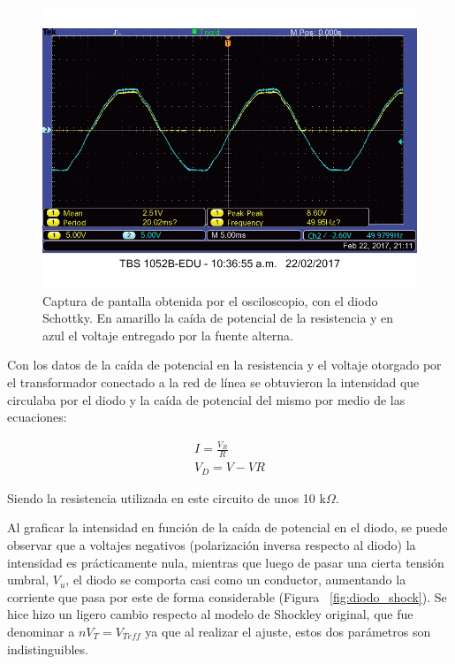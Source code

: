 \documentclass[twoside,twocolumn,a4paper]{article}
\begin{document}
\begin{figure}[h]
\includegraphics[width=\linewidth]{Diodo.jpg}
\captionsetup{justification=centering}
\caption{Captura de pantalla obtenida por el osciloscopio, con el diodo Schottky. En amarillo la ca\'ida de potencial de la resistencia y en azul el voltaje entregado por la fuente alterna.}
\label{fig:diodo2}
\end{figure}

Con los datos de la ca\'ida de potencial en la resistencia y el voltaje otorgado por el transformador conectado a la red de l\'inea se obtuvieron la intensidad que circulaba por el diodo y la ca\'ida de potencial del mismo por medio de las ecuaciones:

\begin{gather}
I=\frac{V_R}{R} \\
V_D=V-VR
\end{gather}

Siendo la resistencia utilizada en este circuito de unos 10 k$\Omega$.
\bigbreak

Al graficar la intensidad en funci\'on de la ca\'ida de potencial en el diodo, se puede observar que a voltajes negativos (polarizaci\'on inversa respecto al diodo) la intensidad es pr\'acticamente nula, mientras que luego de pasar una cierta tensi\'on umbral, $V_u$, el diodo se comporta casi como un conductor, aumentando la corriente que pasa por este de forma considerable (Figura ~\ref{fig:diodo_shock}). Se hice hizo un ligero cambio respecto al modelo de Shockley original, que fue denominar a $nV_T = V_{Teff}$ ya que al realizar el ajuste, estos dos par\'ametros son indistinguibles.
\end{document}
